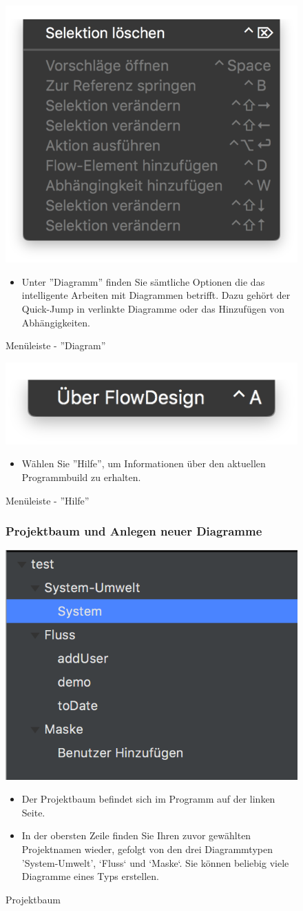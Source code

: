 \begin{figure}[h!]
	\centering
	\includegraphics[width=.4\textwidth]{Leiste_Diagram.png}
	\caption{Menüleiste - ''Diagram''}
\begin{itemize}
\item  Unter ''Diagramm'' finden Sie sämtliche Optionen die das intelligente Arbeiten mit Diagrammen betrifft. Dazu gehört der Quick-Jump in verlinkte Diagramme oder das Hinzufügen von Abhängigkeiten.
\end{itemize}
\end{figure}



\begin{figure}[h!]
	\centering
	\includegraphics[width=.4\textwidth]{Leiste_Hilfe.png}
	\caption{Menüleiste - ''Hilfe''}
\begin{itemize}
\item Wählen Sie ''Hilfe'', um Informationen über den aktuellen Programmbuild zu erhalten.	
\end{itemize}
\end{figure}






\begin{figure}[h!]
\subsubsection{Projektbaum und Anlegen neuer Diagramme}
	\centering
	\includegraphics[width=.4\textwidth]{Projektbaum.png}
	\caption{Projektbaum}
\begin{itemize}
\item Der Projektbaum befindet sich im Programm auf der linken Seite.
\item In der obersten Zeile finden Sie Ihren zuvor gewählten Projektnamen wieder, gefolgt von den drei Diagrammtypen 'System-Umwelt', ‘Fluss‘ und ‘Maske‘. Sie können beliebig viele Diagramme eines Typs erstellen.
\end{itemize}
\end{figure}



